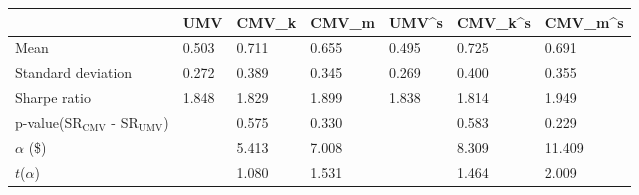 \begin{tabular}{lllllll}
\toprule
 & UMV & CMV_k & CMV_m & UMV^s & CMV_k^s & CMV_m^s \\
\midrule
Mean & 0.503 & 0.711 & 0.655 & 0.495 & 0.725 & 0.691 \\
Standard deviation & 0.272 & 0.389 & 0.345 & 0.269 & 0.400 & 0.355 \\
Sharpe ratio & 1.848 & 1.829 & 1.899 & 1.838 & 1.814 & 1.949 \\
p-value(SR$_{\text{CMV}}$ - SR$_{\text{UMV}}$) &  & 0.575 & 0.330 &  & 0.583 & 0.229 \\
$\alpha$ (\$) &  & 5.413 & 7.008 &  & 8.309 & 11.409 \\
$t$($\alpha$) &  & 1.080 & 1.531 &  & 1.464 & 2.009 \\
\bottomrule
\end{tabular}
